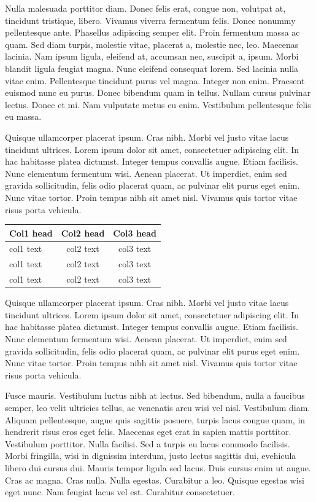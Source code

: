 \documentclass[APA,Times1COL]{WileyNJDv5} %
\begin{document}
Nulla malesuada porttitor diam. Donec felis erat, congue non, volutpat at, tincidunt tristique, libero. Vivamus
viverra fermentum felis. Donec nonummy pellentesque ante. Phasellus adipiscing semper elit. Proin fermentum massa
ac quam. Sed diam turpis, molestie vitae, placerat a, molestie nec, leo. Maecenas lacinia. Nam ipsum ligula, eleifend
at, accumsan nec, suscipit a, ipsum. Morbi blandit ligula feugiat magna. Nunc eleifend consequat lorem. Sed lacinia
nulla vitae enim. Pellentesque tincidunt purus vel magna. Integer non enim. Praesent euismod nunc eu purus. Donec
bibendum quam in tellus. Nullam cursus pulvinar lectus. Donec et mi. Nam vulputate metus eu enim. Vestibulum
pellentesque felis eu massa.

Quisque ullamcorper placerat ipsum. Cras nibh. Morbi vel justo vitae lacus tincidunt ultrices. Lorem ipsum dolor sit
amet, consectetuer adipiscing elit. In hac habitasse platea dictumst. Integer tempus convallis augue. Etiam facilisis.
Nunc elementum fermentum wisi. Aenean placerat. Ut imperdiet, enim sed gravida sollicitudin, felis odio placerat
quam, ac pulvinar elit purus eget enim. Nunc vitae tortor. Proin tempus nibh sit amet nisl. Vivamus quis tortor
vitae risus porta vehicula.


\begin{center}
\begin{tabular*}{250pt}{@{\extracolsep\fill}lcc@{\extracolsep\fill}}%
\toprule
\textbf{Col1 head} & \textbf{Col2 head} & \textbf{Col3 head} \\
\midrule
col1 text & col2 text & col3 text \\
col1 text & col2 text & col3 text \\
col1 text & col2 text & col3 text \\
\bottomrule
\end{tabular*}
\end{center}


Quisque ullamcorper placerat ipsum. Cras nibh. Morbi vel justo vitae lacus tincidunt ultrices. Lorem ipsum dolor sit
amet, consectetuer adipiscing elit. In hac habitasse platea dictumst. Integer tempus convallis augue. Etiam facilisis.
Nunc elementum fermentum wisi. Aenean placerat. Ut imperdiet, enim sed gravida sollicitudin, felis odio placerat
quam, ac pulvinar elit purus eget enim. Nunc vitae tortor. Proin tempus nibh sit amet nisl. Vivamus quis tortor
vitae risus porta vehicula.

Fusce mauris. Vestibulum luctus nibh at lectus. Sed bibendum, nulla a faucibus semper, leo velit ultricies tellus, ac
venenatis arcu wisi vel nisl. Vestibulum diam. Aliquam pellentesque, augue quis sagittis posuere, turpis lacus congue
quam, in hendrerit risus eros eget felis. Maecenas eget erat in sapien mattis porttitor. Vestibulum porttitor. Nulla
facilisi. Sed a turpis eu lacus commodo facilisis. Morbi fringilla, wisi in dignissim interdum, justo lectus sagittis dui, evehicula libero dui cursus dui. Mauris tempor ligula sed lacus. Duis cursus enim ut augue. Cras ac magna. Cras nulla.
Nulla egestas. Curabitur a leo. Quisque egestas wisi eget nunc. Nam feugiat lacus vel est. Curabitur consectetuer.
\end{document}
